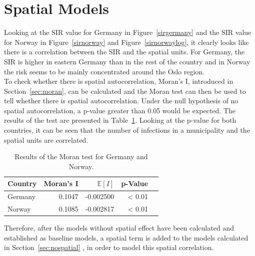 \section{Spatial Models}\label{ch:spatial}
Looking at the SIR value for Germany in Figure~\ref{sirgermany} and the SIR value for Norway in Figure~\ref{sirnorway} and Figure~\ref{sirnorwaylog}, it clearly looks like there is a correlation between the SIR and the spatial units. For Germany, the SIR is higher in eastern Germany than in the rest of the country and in Norway the risk seems to be mainly concentrated around the Oslo region. \\
To check whether there is spatial autocorrelation, Moran's I, introduced in Section~\ref{sec:moran}, can be calculated and the Moran test can then be used to tell whether there is spatial autocorrelation. Under the null hypothesis of no spatial autocorrelation, a p-value greater than 0.05 would be expected. The results of the test are presented in Table~\ref{moranTest}. Looking at the p-value for both countries, it can be seen that the number of infections in a municipality and the spatial units are correlated.
\begin{table}[H] 
\caption{Results of the Moran test for Germany and Norway. \label{moranTest}}
\begin{tabular}{l r r r r}
\toprule
\textbf{Country} & \textbf{Moran's I}	& \textbf{$\mathbb{E}\left[I\right]$}	& \textbf{p-Value} \\
\midrule
Germany & 0.1047 & -0.002500 & < 0.01 \\
Norway & 0.1085 & -0.002817 & < 0.01 \\
\bottomrule
\end{tabular}
\end{table}
Therefore, after the models without spatial effect have been calculated and established as baseline models, a spatial term is added to the models calculated in Section~\ref{sec:nospatial} , in order to model this spatial correlation.
